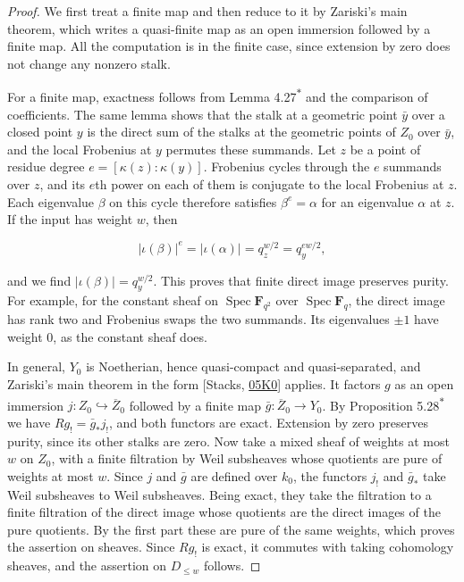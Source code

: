 \documentclass[11pt]{article}
\newcommand{\bpout}[1]{#1\textsuperscript{\hyperlink{bp-outside}{\ensuremath{\ast}}}}
\begin{document}
\begin{proof}[{Proof}]\label{bp276}%
We first treat a finite map and then reduce to it by Zariski's main theorem, which writes a quasi-finite map as an open immersion followed by a finite map. All the computation is in the finite case, since extension by zero does not change any nonzero stalk.

For a finite map, exactness follows from Lemma \bpout{4.27} and the comparison of coefficients. The same lemma shows that the stalk at a geometric point \(\bar y\) over a closed point \(y\) is the direct sum of the stalks at the geometric points of \(Z_0\) over \(\bar y\), and the local Frobenius at \(y\) permutes these summands. Let \(z\) be a point of residue degree \(e=[\kappa(z):\kappa(y)]\). Frobenius cycles through the \(e\) summands over \(z\), and its \(e\)th power on each of them is conjugate to the local Frobenius at \(z\). Each eigenvalue \(\beta\) on this cycle therefore satisfies \(\beta^e=\alpha\) for an eigenvalue \(\alpha\) at \(z\). If the input has weight \(w\), then

\[
|\iota(\beta)|^e=|\iota(\alpha)|=q_z^{w/2}=q_y^{ew/2},
\]

and we find \(|\iota(\beta)|=q_y^{w/2}\). This proves that finite direct image preserves purity. For example, for the constant sheaf on \(\operatorname{Spec}\mathbf F_{q^2}\) over \(\operatorname{Spec}\mathbf F_q\), the direct image has rank two and Frobenius swaps the two summands. Its eigenvalues \(\pm1\) have weight \(0\), as the constant sheaf does.

In general, \(Y_0\) is Noetherian, hence quasi-compact and quasi-separated, and Zariski's main theorem in the form [Stacks, \href{https://stacks.math.columbia.edu/tag/05K0}{05K0}] applies. It factors \(g\) as an open immersion \(j:Z_0\hookrightarrow\overline Z_0\) followed by a finite map \(\bar g:\overline Z_0\to Y_0\). By Proposition \bpout{5.28} we have \(Rg_!=\bar g_*j_!\), and both functors are exact. Extension by zero preserves purity, since its other stalks are zero. Now take a mixed sheaf of weights at most \(w\) on \(Z_0\), with a finite filtration by Weil subsheaves whose quotients are pure of weights at most \(w\). Since \(j\) and \(\bar g\) are defined over \(k_0\), the functors \(j_!\) and \(\bar g_*\) take Weil subsheaves to Weil subsheaves. Being exact, they take the filtration to a finite filtration of the direct image whose quotients are the direct images of the pure quotients. By the first part these are pure of the same weights, which proves the assertion on sheaves. Since \(Rg_!\) is exact, it commutes with taking cohomology sheaves, and the assertion on \(D_{\leq w}\) follows.
\end{proof}
\end{document}
